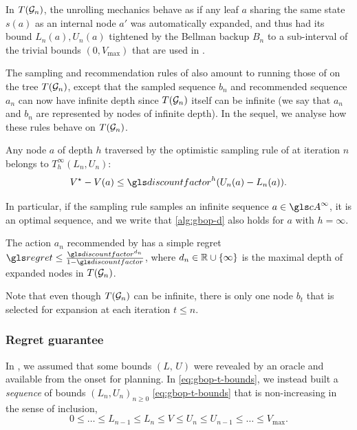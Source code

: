 In $T(\mathcal{G}_n)$, the unrolling mechanics behave as if any leaf $a$ sharing the same state $s(a)$ as an internal node $a'$ was automatically expanded, and thus had its bound $L_n(a), U_n(a)$ tightened by the Bellman backup $B_n$ to a sub-interval of the trivial bounds $(0, V_{\max})$ that are used in \OPD.

The sampling and recommendation rules of \GBOPD also amount to running those of \OPD on the tree $T(\mathcal{G}_n)$, except that the sampled sequence $b_n$ and recommended sequence $a_n$ can now have infinite depth since $T(\mathcal{G}_n)$ itself can be infinite (we say that $a_n$ and $b_n$ are represented by nodes of infinite depth). In the sequel, we analyse how these rules behave on $T(\mathcal{G}_n)$.

\begin{lemma}[Expansion]
	\begin{leftbar}[lemmabar]
	\label{lem:expansion-bound}
	Any node $a$ of depth $h$ traversed by the optimistic sampling rule of \GBOPD at iteration $n$ belongs to $T_h^\infty(L_n, U_n)$: 
	\begin{equation}
	\label{eq:expansion-regret}
	V^\star-V(a) \leq \discount^h(U_n(a)-L_n(a)).
	\end{equation}
	
	In particular, if the sampling rule samples an infinite sequence $a\in \cA^\infty$, it is an optimal sequence, and we write that \eqref{alg:gbop-d} also holds for $a$ with $h=\infty$.
	\end{leftbar}
\end{lemma}


\begin{lemma}[Recommendation]
	\begin{leftbar}[lemmabar]
	\label{lem:recommendation-bound}
	The action $a_n$ recommended by \GBOPD has a simple regret $\regret \leq \frac{\discount^{d_n}}{1-\discount}$, where $d_n\in\mathbb{R}\cup\{\infty\}$ is the maximal depth of expanded nodes in $T(\mathcal{G}_n)$.
	\end{leftbar}
\end{lemma}
Note that even though $T(\mathcal{G}_n)$ can be infinite, there is only one node $b_t$ that is selected for expansion at each iteration $t\leq n$.

\subsubsection{Regret guarantee}

In , we assumed that some bounds $(L,\,U)$ were revealed by an oracle and available from the onset for planning. In \eqref{eq:gbop-t-bounds}, we instead built a \emph{sequence} of bounds $(L_n,U_n)_{n\geq 0}$ \eqref{eq:gbop-t-bounds} that is non-increasing in the sense of inclusion, \ie $$0\leq \dots\leq L_{n-1}\leq L_n\leq V\leq U_n\leq U_{n-1}\leq \dots\leq V_{\max}.$$

